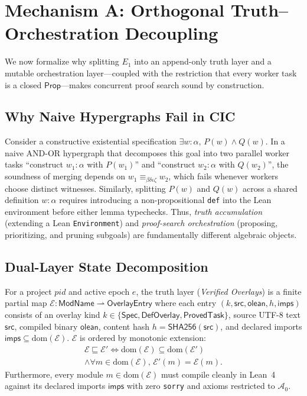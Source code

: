 \documentclass[sigplan,nonacm,10pt]{acmart}
\newcommand{\Truth}{\mathcal{E}}
\newcommand{\Prop}{\mathsf{Prop}}
\newcommand{\DefEq}{\equiv_{\beta\delta\iota\zeta}}
\newcommand{\AxiomsZero}{\mathcal{A}_0}
\newcommand{\kw}[1]{\mathsf{#1}}
\newcommand{\code}[1]{\texttt{#1}}
\begin{document}
\section{Mechanism A: Orthogonal Truth--Orchestration Decoupling}\label{sec:mech-a}

We now formalize why splitting $E_1$ into an append-only truth layer and a mutable orchestration layer—coupled with the restriction that every worker task is a closed $\Prop$—makes concurrent proof search sound by construction.

\subsection{Why Naive Hypergraphs Fail in CIC}
Consider a constructive existential specification $\exists w : \alpha,\, P(w) \land Q(w)$. In a naive AND-OR hypergraph that decomposes this goal into two parallel worker tasks ``construct $w_1 : \alpha$ with $P(w_1)$'' and ``construct $w_2 : \alpha$ with $Q(w_2)$'', the soundness of merging depends on $w_1 \DefEq w_2$, which fails whenever workers choose distinct witnesses. Similarly, splitting $P(w)$ and $Q(w)$ across a shared definition $w : \alpha$ requires introducing a non-propositional \code{def} into the Lean environment before either lemma typechecks. Thus, \emph{truth accumulation} (extending a Lean \code{Environment}) and \emph{proof-search orchestration} (proposing, prioritizing, and pruning subgoals) are fundamentally different algebraic objects.

\subsection{Dual-Layer State Decomposition}

\begin{definition}[Monotonic Truth Layer $\Truth$]\label{def:truth-layer}
For a project $pid$ and active epoch $e$, the truth layer (\emph{Verified Overlays}) is a finite partial map $\Truth : \kw{ModName} \rightharpoonup \kw{OverlayEntry}$ where each entry $(k, \kw{src}, \kw{olean}, h, \kw{imps})$ consists of an overlay kind $k \in \{\kw{Spec}, \kw{DefOverlay}, \kw{ProvedTask}\}$, source UTF-8 text $\kw{src}$, compiled binary $\kw{olean}$, content hash $h = \kw{SHA256}(\kw{src})$, and declared imports $\kw{imps} \subseteq \mathrm{dom}(\Truth)$. $\Truth$ is ordered by monotonic extension:
\begin{multline*}
\Truth \sqsubseteq \Truth' \iff \mathrm{dom}(\Truth) \subseteq \mathrm{dom}(\Truth') \\
  \land \forall m \in \mathrm{dom}(\Truth),\, \Truth'(m) = \Truth(m).
\end{multline*}
Furthermore, every module $m \in \mathrm{dom}(\Truth)$ must compile cleanly in Lean~4 against its declared imports $\kw{imps}$ with zero \code{sorry} and axioms restricted to $\AxiomsZero$.
\end{definition}
\end{document}
